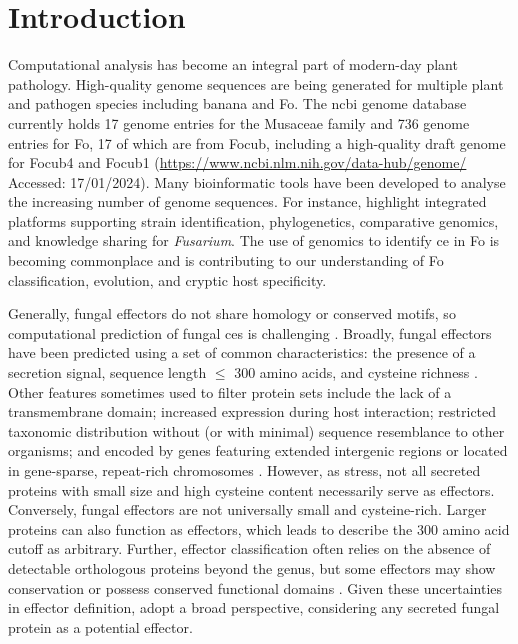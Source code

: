 \section{Introduction}

Computational analysis has become an integral part of modern-day plant pathology. High-quality genome sequences are being generated for multiple plant and pathogen species including banana and \ac{Fo}. The \ac{ncbi} genome database currently holds 17 genome entries for the Musaceae family and 736 genome entries for \ac{Fo}, 17 of which are from \ac{Focub}, including a high-quality draft genome for \ac{Focub4} \parencite{Warmington2019} and \ac{Focub1} \parencite{Asai2019} (\href{https://www.ncbi.nlm.nih.gov/data-hub/genome/}{https://www.ncbi.nlm.nih.gov/data-hub/genome/} Accessed: 17/01/2024). Many bioinformatic tools have been developed to analyse the increasing number of genome sequences. For instance, \textcite{Park2010} highlight integrated platforms supporting strain identification, phylogenetics, comparative genomics, and knowledge sharing for \textit{Fusarium}. The use of genomics to identify \acf{ce} in \ac{Fo} is becoming commonplace and is contributing to our understanding of \ac{Fo} classification, evolution, and cryptic host specificity. 

Generally, fungal effectors do not share homology or conserved motifs, so computational prediction of fungal \acp{ce} is challenging \parencite{Sperschneider2022, Todd2022}. Broadly, fungal effectors have been predicted using a set of common characteristics: the presence of a secretion signal, sequence length $\leq$ 300 amino acids, and cysteine richness \parencite{Sperschneider2015}. Other features sometimes used to filter protein sets include the lack of a transmembrane domain; increased expression during host interaction; restricted taxonomic distribution without (or with minimal) sequence resemblance to other organisms; and encoded by genes featuring extended intergenic regions or located in gene-sparse, repeat-rich chromosomes \parencite{Dalio2018, Todd2022}. However, as \textcite{LoPresti2015, Sperschneider2015} stress, not all secreted proteins with small size and high cysteine content necessarily serve as effectors. Conversely, fungal effectors are not universally small and cysteine-rich. Larger proteins can also function as effectors, which leads \textcite{LoPresti2015} to describe the 300 amino acid cutoff as arbitrary. Further, effector classification often relies on the absence of detectable orthologous proteins beyond the genus, but some effectors may show conservation or possess conserved functional domains \parencite{Jonge2010, Djamei2011, Mentlak2012}. Given these uncertainties in effector definition, \textcite{LoPresti2015} adopt a broad perspective, considering any secreted fungal protein as a potential effector. 

